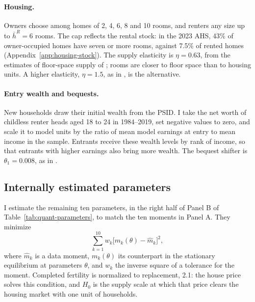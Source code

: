 \paragraph{Housing.}
Owners choose among homes of 2, 4, 6, 8 and 10 rooms, and renters any size
up to $\bar h^R=6$ rooms. The cap reflects the rental stock: in the 2023 AHS,
43\% of owner-occupied homes have seven or more rooms, against 7.5\% of
rented homes (Appendix~\ref{app:housing-stock}). The supply elasticity is
$\eta=0.63$, from the estimates of floor-space supply of
\citet{baum-snowMicrogeographyHousingSupply2024}; rooms are closer to floor
space than to housing units. A higher elasticity, $\eta=1.5$, as in
\citet{kaplanMitmanViolanteHousing2020}, is the alternative.

\paragraph{Entry wealth and bequests.}
New households draw their initial wealth from the PSID. I take the net worth
of childless renter heads aged 18 to 24 in 1984--2019, set negative values to
zero, and scale it to model units by the ratio of mean model earnings at
entry to mean income in the sample. Entrants receive these wealth levels by
rank of income, so that entrants with higher earnings also bring more
wealth. The bequest shifter is $\theta_1=0.008$, as in
\citet{greaneyDynamicUrbanEconomics2025}.

\subsection{Internally estimated parameters}
\label{sec:quant-identification}

I estimate the remaining ten parameters, in the right half of Panel B of
Table~\ref{tab:quant-parameters}, to match the ten moments in Panel A.
They minimize
\begin{equation}
\sum_{k=1}^{10} w_k\bigl[m_k(\theta)-\hat m_k\bigr]^2,
\label{eq:q-loss}
\end{equation}
where $\hat m_k$ is a data moment, $m_k(\theta)$ its counterpart in the
stationary equilibrium at parameters $\theta$, and $w_k$ the inverse square
of a tolerance for the moment. Completed fertility is normalized to
replacement, 2.1: the house price solves this condition, and $H_0$ is the
supply scale at which that price clears the housing market with one unit of
households.


